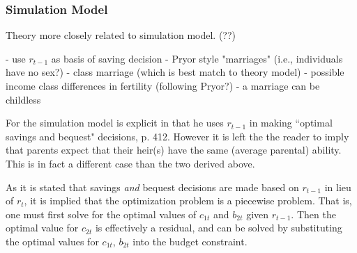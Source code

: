 \documentclass{article}
\begin{document}


\subsubsection{Simulation Model}

Theory more closely related to simulation model. (??)

- use $r_{t-1}$ as basis of saving decision
- Pryor style "marriages" (i.e., individuals have no sex?)
- class marriage (which is best match to theory model)
- possible income class differences in fertility (following Pryor?)
- a marriage can be childless

For the simulation model \citet{pestieau-1984-oep} is explicit in that he uses $r_{t-1}$ in making ``optimal savings and bequest" decisions, p. 412.  However it is left the the reader to imply that parents expect that their heir(s) have the same (average parental) ability.  This is in fact a different case than the two derived above.

As it is stated that savings \emph{and} bequest decisions are made based on $r_{t-1}$ in lieu of $r_t$, it is implied that the optimization problem is a piecewise problem.  That is, one must first solve for the optimal values of $c_{1t}$ and $b_{2t}$ given $r_{t-1}$.  Then the optimal value for $c_{2t}$ is effectively a residual, and can be solved by substituting the optimal values for $c_{1t}$, $b_{2t}$ into the budget constraint.
\end{document}
